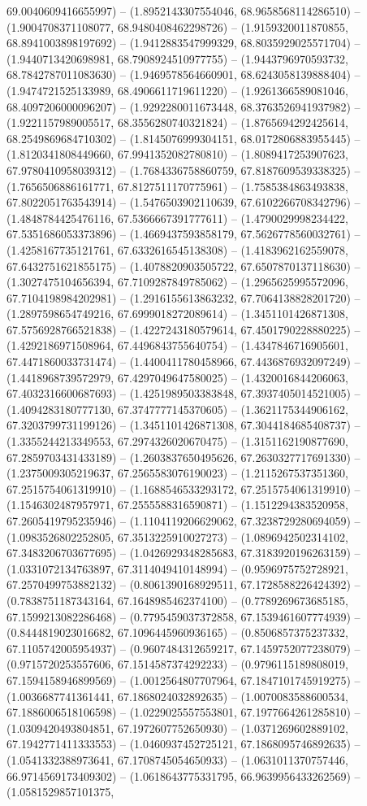 69.0040609416655997) -- (1.8952143307554046, 68.9658568114286510) -- (1.9004708371108077, 68.9480408462298726) -- (1.9159320011870855, 68.8941003898197692) -- (1.9412883547999329, 68.8035929025571704) -- (1.9440713420698981, 68.7908924510977755) -- (1.9443796970593732, 68.7842787011083630) -- (1.9469578564660901, 68.6243058139888404) -- (1.9474721525133989, 68.4906611719611220) -- (1.9261366589081046, 68.4097206000096207) -- (1.9292280011673448, 68.3763526941937982) -- (1.9221157989005517, 68.3556280740321824) -- (1.8765694292425614, 68.2549869684710302) -- (1.8145076999304151, 68.0172806883955445) -- (1.8120341808449660, 67.9941352082780810) -- (1.8089417253907623, 67.9780410958039312) -- (1.7684336758860759, 67.8187609539338325) -- (1.7656506886161771, 67.8127511170775961) -- (1.7585384863493838, 67.8022051763543914) -- (1.5476503902110639, 67.6102266708342796) -- (1.4848784425476116, 67.5366667391777611) -- (1.4790029998234422, 67.5351686053373896) -- (1.4669437593858179, 67.5626778560032761) -- (1.4258167735121761, 67.6332616545138308) -- (1.4183962162559078, 67.6432751621855175) -- (1.4078820903505722, 67.6507870137118630) -- (1.3027475104656394, 67.7109287849785062) -- (1.2965625995572096, 67.7104198984202981) -- (1.2916155613863232, 67.7064138828201720) -- (1.2897598654749216, 67.6999018272089614) -- (1.3451101426871308, 67.5756928766521838) -- (1.4227243180579614, 67.4501790228880225) -- (1.4292186971508964, 67.4496843755640754) -- (1.4347846716905601, 67.4471860033731474) -- (1.4400411780458966, 67.4436876932097249) -- (1.4418968739572979, 67.4297049647580025) -- (1.4320016844206063, 67.4032316600687693) -- (1.4251989503383848, 67.3937405014521005) -- (1.4094283180777130, 67.3747777145370605) -- (1.3621175344906162, 67.3203799731199126) -- (1.3451101426871308, 67.3044184685408737) -- (1.3355244213349553, 67.2974326020670475) -- (1.3151162190877690, 67.2859703431433189) -- (1.2603837650495626, 67.2630327717691330) -- (1.2375009305219637, 67.2565583076190023) -- (1.2115267537351360, 67.2515754061319910) -- (1.1688546533293172, 67.2515754061319910) -- (1.1546302487957971, 67.2555588316590871) -- (1.1512294383520958, 67.2605419795235946) -- (1.1104119206629062, 67.3238729280694059) -- (1.0983526802252805, 67.3513225910027273) -- (1.0896942502314102, 67.3483206703677695) -- (1.0426929348285683, 67.3183920196263159) -- (1.0331072134763897, 67.3114049410148994) -- (0.9596975752728921, 67.2570499753882132) -- (0.8061390168929511, 67.1728588226424392) -- (0.7838751187343164, 67.1648985462374100) -- (0.7789269673685185, 67.1599213082286468) -- (0.7795459037372858, 67.1539461607774939) -- (0.8444819023016682, 67.1096445960936165) -- (0.8506857375237332, 67.1105742005954937) -- (0.9607484312659217, 67.1459752077238079) -- (0.9715720253557606, 67.1514587374292233) -- (0.9796115189808019, 67.1594158946899569) -- (1.0012564807707964, 67.1847101745919275) -- (1.0036687741361441, 67.1868024032892635) -- (1.0070083588600534, 67.1886006518106598) -- (1.0229025557553801, 67.1977664261285810) -- (1.0309420493804851, 67.1972607752650930) -- (1.0371269602889102, 67.1942771411333553) -- (1.0460937452725121, 67.1868095746892635) -- (1.0541332388973641, 67.1708745054650933) -- (1.0631011370757446, 66.9714569173409302) -- (1.0618643775331795, 66.9639956433262569) -- (1.0581529857101375, 